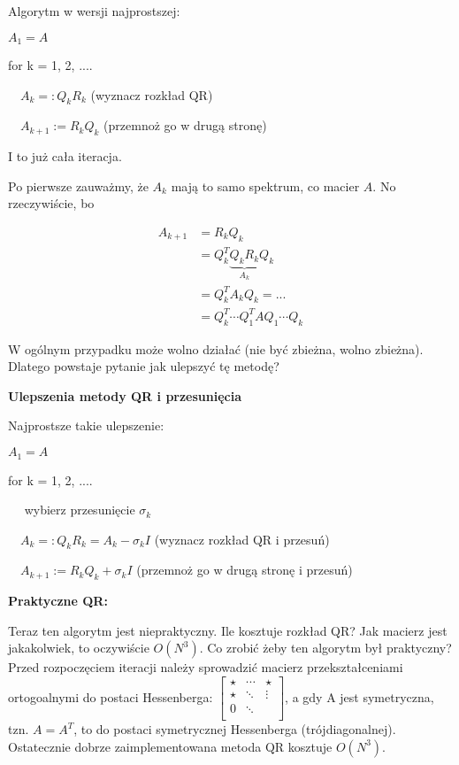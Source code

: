 \documentclass[hidelinks,a4paper,fleqn]{article}
\begin{document}
Algorytm w wersji najprostszej:

$A_1 = A$

for k = 1, 2, ....

$\quad A_k =: Q_kR_k$ (wyznacz rozkład QR)
 
$\quad A_{k+1} := R_kQ_k$ (przemnoż go w drugą stronę)

I to już cała iteracja.

Po pierwsze zauważmy, że $A_k$ mają to samo spektrum, co macier $A$. No rzeczywiście, bo 

\begin{equation}
	\begin{aligned}
		A_{k+1} & = R_kQ_k                            \\
		        & = Q_k^T\underbrace{Q_kR_k}_{A_k}Q_k \\
		        & = Q_k^TA_kQ_k = ...                 \\
		        & = Q_k^T\cdots Q_1^TA Q_1 \cdots Q_k 
	\end{aligned}
\end{equation}

W ogólnym przypadku może wolno działać (nie być zbieżna, wolno zbieżna). Dlatego powstaje pytanie jak ulepszyć tę metodę? 

\textbf{Ulepszenia metody QR i przesunięcia}

Najprostsze takie ulepszenie:

$A_1 = A$

for k = 1, 2, ....

$\quad$ wybierz przesunięcie $\sigma_k$

$\quad A_k =: Q_kR_k = A_k - \sigma_k I $ (wyznacz rozkład QR i przesuń)
 
$\quad A_{k+1} := R_kQ_k + \sigma_k I$ (przemnoż go w drugą stronę i przesuń)

\textbf{Praktyczne QR:}

Teraz ten algorytm jest niepraktyczny. Ile kosztuje rozkład QR? Jak macierz jest jakakolwiek, to oczywiście $O(N^3)$. Co zrobić żeby ten algorytm był praktyczny? Przed rozpoczęciem iteracji należy sprowadzić macierz przekształceniami ortogoalnymi do postaci Hessenberga: $\left[ \begin{array}{cccc} \star & \cdots & \star \\ \star & \ddots & \vdots \\ 0 & \ddots \\  \end{array} \right]$, a gdy A jest symetryczna, tzn. $A=A^T$, to do postaci symetrycznej Hessenberga (trójdiagonalnej). Ostatecznie dobrze zaimplementowana metoda QR kosztuje $O(N^3)$.
\end{document}
